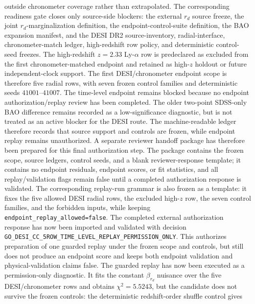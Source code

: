 \documentclass[11pt]{article}
\begin{document}
outside chronometer coverage rather than extrapolated.
The corresponding readiness gate closes only source-side blockers: the external
\(r_d\) source freeze, the joint \(r_d\)-marginalization definition, the
endpoint-control-suite definition, the BAO expansion manifest, and the DESI DR2
source-inventory, radial-interface, chronometer-match ledger, high-redshift row
policy, and deterministic control-seed freezes.  The high-redshift \(z=2.33\)
Ly-\(\alpha\) row is predeclared as excluded from the first chronometer-matched
endpoint and retained as high-\(z\) holdout or future independent-clock support.
The first DESI/chronometer endpoint scope is therefore five radial rows, with
seven frozen control families and deterministic seeds \(41001\)--\(41007\).  The
time-level endpoint remains blocked because no endpoint authorization/replay
review has been completed.  The older two-point SDSS-only BAO difference remains
recorded as a low-significance diagnostic, but is not treated as an active
blocker for the DESI route.
The machine-readable ledger therefore records that source support and controls
are frozen, while endpoint replay remains unauthorized.
A separate reviewer handoff package has therefore been prepared for this final
authorization step.  The package contains the frozen scope, source ledgers,
control seeds, and a blank reviewer-response template; it contains no endpoint
residuals, endpoint scores, or fit statistics, and all replay/validation flags
remain false until a completed authorization response is validated.
The corresponding replay-run grammar is also frozen as a template: it fixes the
five allowed DESI radial rows, the excluded high-\(z\) row, the seven control
families, and the forbidden inputs, while keeping
\texttt{endpoint\_\allowbreak{}replay\_\allowbreak{}allowed=\allowbreak{}false}.
The completed external authorization response has now been imported and
validated with decision
\texttt{GO\_\allowbreak{}DESI\_\allowbreak{}CC\_\allowbreak{}5ROW\_\allowbreak{}TIME\_\allowbreak{}LEVEL\_\allowbreak{}REPLAY\_\allowbreak{}PERMISSION\_\allowbreak{}ONLY}.  This
authorizes preparation of one guarded replay under the frozen scope and
controls, but still does not produce an endpoint score and keeps both endpoint
validation and physical-validation claims false.
The guarded replay has now been executed as a permission-only diagnostic.  It
fits the constant \(\beta_{r_d}\) nuisance over the five DESI/chronometer rows
and obtains \(\chi^2=5.5243\), but the candidate does not survive the frozen
controls: the deterministic redshift-order shuffle control gives
\end{document}
